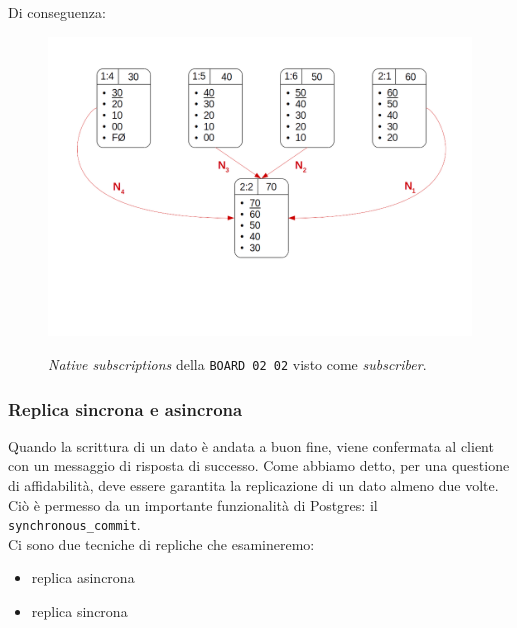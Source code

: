 Di conseguenza:

\begin{figure}[htbp]
\centering
\includegraphics[scale=0.40]{img/sub_native.png}\\
\caption{\textit{Native subscriptions} della \verb"BOARD 02 02" visto come \textit{subscriber}. \label{figura1.20}}
\end{figure}

\subsubsection{Replica sincrona e asincrona}
Quando la scrittura di un dato \`{e} andata a buon fine, viene confermata al client con un messaggio di risposta di successo. Come abbiamo detto, per una questione di affidabilit\`{a}, deve essere garantita la replicazione di un dato almeno due volte. Ci\`{o} \`{e} permesso da un importante funzionalit\`{a} di Postgres: il \verb"synchronous_commit".\\
Ci sono due tecniche di repliche che esamineremo: 
\begin{itemize}
\item 
replica asincrona 
\item
replica sincrona
\end{itemize}

